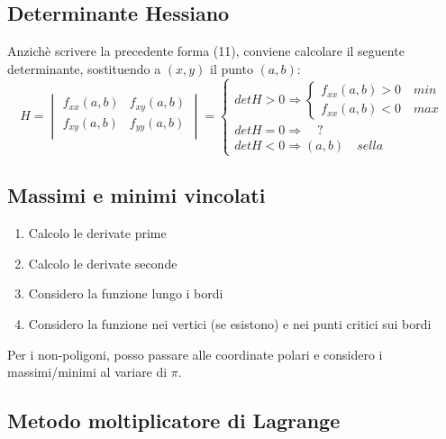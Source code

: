 \documentclass[10pt,a4paper,fleqn]{article}
\begin{document}
	\subsection{Determinante Hessiano}

	Anzichè scrivere la precedente forma (11), conviene calcolare il seguente determinante, sostituendo a $(x, y)$ il punto $(a,b)$:
	\begin{equation}
	H = \begin{vmatrix}
	f_{xx}(a,b) & f_{xy}(a,b) \\
	f_{xy}(a,b) & f_{yy}(a,b) \\
	\end{vmatrix}
	= \begin{cases}
	detH > 0 \Rightarrow \begin{cases}
	f_{xx}(a,b) > 0 \quad \textit{min}\\
	f_{xx}(a,b) < 0 \quad \textit{max}
	\end{cases}\\
	detH = 0 \Rightarrow \quad?\\
	detH < 0 \Rightarrow (a,b) \quad \textit{sella}
	
	\end{cases}
	\end{equation}

	\subsection{Massimi e minimi vincolati}

	\begin{enumerate}
	\item Calcolo le derivate prime
	\item Calcolo le derivate seconde
	\item Considero la funzione lungo i bordi
	\item Considero la funzione nei vertici (se esistono) e nei punti critici sui bordi
	\end{enumerate}
	Per i non-poligoni, posso passare alle coordinate polari e considero i massimi/minimi al variare di $\pi$.

	\subsection{Metodo moltiplicatore di Lagrange}
\end{document}
